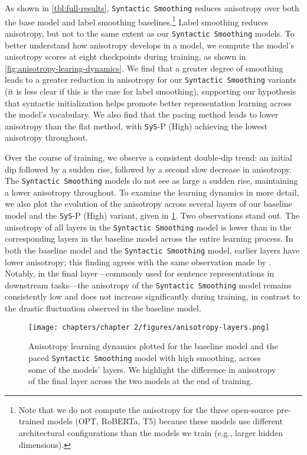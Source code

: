 As shown in \cref{tbl:full-results}, \texttt{Syntactic Smoothing} reduces anisotropy over both the base model and label smoothing baselines.\footnote{Note that we do not compute the anisotropy for the three open-source pre-trained models (OPT, RoBERTa, T5) because these models use different architectural configurations than the models we train (e.g., larger hidden dimensions).} Label smoothing reduces anisotropy, but not to the same extent as our \texttt{Syntactic Smoothing} models. To better understand how anisotropy develops in a model, we compute the model's anisotropy scores at eight checkpoints during training, as shown in \cref{fig:anisotropy-learing-dynamics}. We find that a greater degree of smoothing leads to a greater reduction in anisotropy for our \texttt{Syntactic Smoothing} variants (it is less clear if this is the case for label smoothing), supporting our hypothesis that syntactic initialization helps promote better representation learning across the model's vocabulary. We also find that the pacing method leads to lower anisotropy than the flat method, with \texttt{SyS}-P (High) achieving the lowest anisotropy throughout.

Over the course of training, we observe a consistent double-dip trend: an initial dip followed by a sudden rise, followed by a second slow decrease in anisotropy. The \texttt{Syntactic Smoothing} models do not see as large a sudden rise, maintaining a lower anisotropy throughout. To examine the learning dynamics in more detail, we also plot the evolution of the anisotropy across several layers of our baseline model and the \texttt{SyS}-P (High) variant, given in \cref{fig:anisotropy-layers}. Two observations stand out. The anisotropy of all layers in the \texttt{Syntactic Smoothing} model is lower than in the corresponding layers in the baseline model across the entire learning process. In both the baseline model and the \texttt{Syntactic Smoothing} model, earlier layers have lower anisotropy; this finding agrees with the same observation made by \citeauthor{ethayarajh2019contextual}. Notably, in the final layer—commonly used for sentence representations in downstream tasks—the anisotropy of the \texttt{Syntactic Smoothing} model remains consistently low and does not increase significantly during training, in contrast to the drastic fluctuation observed in the baseline model. 

\begin{figure}[h]
    \centering
    \texttt{[image: chapters/chapter 2/figures/anisotropy-layers.png]}
    \caption{Anisotropy learning dynamics plotted for the baseline model and the paced \texttt{Syntactic Smoothing} model with high smoothing, across some of the models' layers. We highlight the difference in anisotropy of the final layer across the two models at the end of training.}
    \label{fig:anisotropy-layers}
    \vspace{-1em}
\end{figure}

